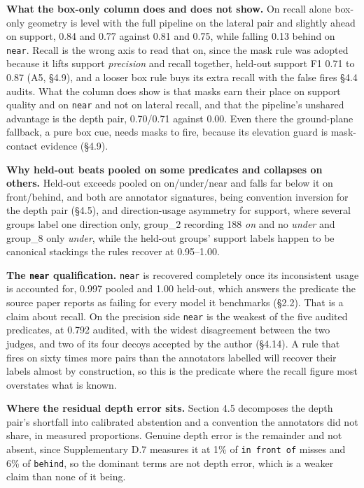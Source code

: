 \textbf{What the box-only column does and does not show.} On recall alone box-only geometry is level with the full pipeline on the lateral pair and slightly ahead on support, 0.84 and 0.77 against 0.81 and 0.75, while falling 0.13 behind on \texttt{near}. Recall is the wrong axis to read that on, since the mask rule was adopted because it lifts support \textit{precision} and recall together, held-out support F1 0.71 to 0.87 (A5, \S{}4.9), and a looser box rule buys its extra recall with the false fires \S{}4.4 audits. What the column does show is that masks earn their place on support quality and on \texttt{near} and not on lateral recall, and that the pipeline's unshared advantage is the depth pair, 0.70/0.71 against 0.00. Even there the ground-plane fallback, a pure box cue, needs masks to fire, because its elevation guard is mask-contact evidence (\S{}4.9).

\textbf{Why held-out beats pooled on some predicates and collapses on others.} Held-out exceeds pooled on on/under/near and falls far below it on front/behind, and both are annotator signatures, being convention inversion for the depth pair (\S{}4.5), and direction-usage asymmetry for support, where several groups label one direction only, group\_\allowbreak{}2 recording 188 \textit{on} and no \textit{under} and group\_\allowbreak{}8 only \textit{under}, while the held-out groups' support labels happen to be canonical stackings the rules recover at 0.95--1.00.

\textbf{The \texttt{near} qualification.} \texttt{near} is recovered completely once its inconsistent usage is accounted for, 0.997 pooled and 1.00 held-out, which answers the predicate the source paper reports as failing for every model it benchmarks (\S{}2.2). That is a claim about recall. On the precision side \texttt{near} is the weakest of the five audited predicates, at 0.792 audited, with the widest disagreement between the two judges, and two of its four decoys accepted by the author (\S{}4.14). A rule that fires on sixty times more pairs than the annotators labelled will recover their labels almost by construction, so this is the predicate where the recall figure most overstates what is known.

\textbf{Where the residual depth error sits.} Section 4.5 decomposes the depth pair's shortfall into calibrated abstention and a convention the annotators did not share, in measured proportions. Genuine depth error is the remainder and not absent, since Supplementary D.7 measures it at 1\% of \texttt{in front of} misses and 6\% of \texttt{behind}, so the dominant terms are not depth error, which is a weaker claim than none of it being.

